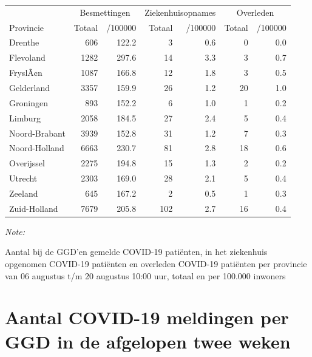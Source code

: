 \documentclass[
  english,
  man,floatsintext]{apa6}
\begin{document}
\begin{table}
\centering
\begin{threeparttable}
\begin{tabular}{lrrrrrr}
\toprule
\multicolumn{1}{c}{ } & \multicolumn{2}{c}{Besmettingen} & \multicolumn{2}{c}{Ziekenhuisopnames} & \multicolumn{2}{c}{Overleden} \\
\cmidrule(l{3pt}r{3pt}){2-3} \cmidrule(l{3pt}r{3pt}){4-5} \cmidrule(l{3pt}r{3pt}){6-7}
Provincie & Totaal & /100000 & Totaal & /100000 & Totaal & /100000\\
\midrule
Drenthe & 606 & 122.2 & 3 & 0.6 & 0 & 0.0\\
Flevoland & 1282 & 297.6 & 14 & 3.3 & 3 & 0.7\\
FryslÃ¢n & 1087 & 166.8 & 12 & 1.8 & 3 & 0.5\\
Gelderland & 3357 & 159.9 & 26 & 1.2 & 20 & 1.0\\
Groningen & 893 & 152.2 & 6 & 1.0 & 1 & 0.2\\
Limburg & 2058 & 184.5 & 27 & 2.4 & 5 & 0.4\\
Noord-Brabant & 3939 & 152.8 & 31 & 1.2 & 7 & 0.3\\
Noord-Holland & 6663 & 230.7 & 81 & 2.8 & 18 & 0.6\\
Overijssel & 2275 & 194.8 & 15 & 1.3 & 2 & 0.2\\
Utrecht & 2303 & 169.0 & 28 & 2.1 & 5 & 0.4\\
Zeeland & 645 & 167.2 & 2 & 0.5 & 1 & 0.3\\
Zuid-Holland & 7679 & 205.8 & 102 & 2.7 & 16 & 0.4\\
\bottomrule
\end{tabular}
\begin{tablenotes}
\item \textit{Note: } 
\item Aantal bij de GGD’en gemelde COVID-19 patiënten, in het ziekenhuis opgenomen COVID-19 patiënten en overleden COVID-19 patiënten per provincie van 06 augustus t/m 20 augustus 10:00 uur, totaal en per 100.000 inwoners
\end{tablenotes}
\end{threeparttable}
\end{table}

\newpage

\hypertarget{aantal-covid-19-meldingen-per-ggd-in-de-afgelopen-twee-weken}{%
\section{Aantal COVID-19 meldingen per GGD in de afgelopen twee weken}\label{aantal-covid-19-meldingen-per-ggd-in-de-afgelopen-twee-weken}}
\end{document}

